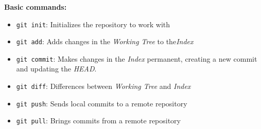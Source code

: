 \begin{frame}
  \frametitle{\insertsubsection}

  \textbf{Basic commands:}
  \begin{itemize}

  \item \texttt{git init}: Initializes the repository to work with
    \git \vspacing

  \item \texttt{git add}: Adds changes in the \textit{Working Tree} to
    the\textit{Index}
    \vspacing

  \item \texttt{git commit}: Makes changes in the \textit{Index}
    permanent, creating a new commit and updating the \textit{HEAD}.
    \vspacing

  \item \texttt{git diff}: Differences between \textit{Working Tree} and
    \textit{Index}
    \vspacing

  \item \texttt{git push}: Sends local commits to a remote repository\vspacing

  \item \texttt{git pull}: Brings commits from a remote repository\vspacing

  \end{itemize}
\end{frame}


